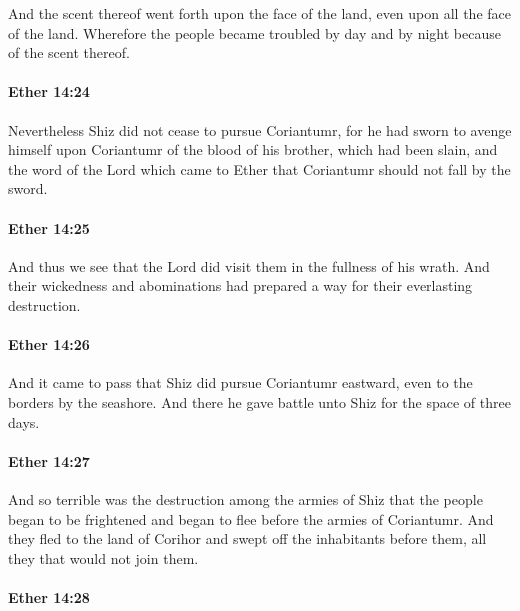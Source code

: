 			And the scent thereof went forth upon the face of the land,
			even upon all the face of the land.
			Wherefore the people became troubled by day and by night
			because of the scent thereof.

		\paragraph{Ether 14:24} %
			\label{ETHER-14-24}

			Nevertheless Shiz did not cease to pursue Coriantumr,
			for he had sworn to avenge himself upon Coriantumr
			of the blood of his brother, which had been slain,
			and the word of the Lord which came to Ether
			that Coriantumr should not fall by the sword.

		\paragraph{Ether 14:25} %
			\label{ETHER-14-25}

			And thus we see that the Lord did visit them in the fullness of his wrath.
			And their wickedness and abominations had prepared a way
			for their everlasting destruction.

		\paragraph{Ether 14:26} %
			\label{ETHER-14-26}

			And it came to pass that Shiz did pursue Coriantumr eastward,
			even to the borders by the seashore.
			And there he gave battle unto Shiz for the space of three days.

		\paragraph{Ether 14:27} %
			\label{ETHER-14-27}

			And so terrible was the destruction among the armies of Shiz
			that the people began to be frightened
			and began to flee before the armies of Coriantumr.
			And they fled to the land of Corihor
			and swept off the inhabitants before them,
			all they that would not join them.

		\paragraph{Ether 14:28} %
			\label{ETHER-14-28}


